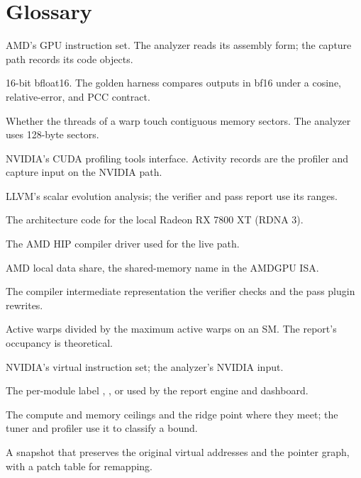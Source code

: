 \section{Glossary}
\label{app:glossary}

\begin{description}[leftmargin=0pt,style=nextline,itemsep=1pt]
  \item[AMDGPU] AMD's GPU instruction set. The analyzer reads its assembly
        form; the capture path records its code objects.
  \item[bf16] 16-bit bfloat16. The golden harness compares outputs in bf16
        under a cosine, relative-error, and PCC contract.
  \item[coalescing] Whether the threads of a warp touch contiguous memory
        sectors. The analyzer uses 128-byte sectors.
  \item[CUPTI] NVIDIA's CUDA profiling tools interface. Activity records are
        the profiler and capture input on the NVIDIA path.
  \item[DFA / SCEV] LLVM's scalar evolution analysis; the verifier and pass
        report use its ranges.
  \item[gfx1101] The architecture code for the local Radeon RX 7800 XT
        (RDNA 3).
  \item[hipcc] The AMD HIP compiler driver used for the live path.
  \item[LDS] AMD local data share, the shared-memory name in the AMDGPU ISA.
  \item[LLVM IR] The compiler intermediate representation the verifier checks
        and the pass plugin rewrites.
  \item[occupancy] Active warps divided by the maximum active warps on an SM.
        The report's occupancy is theoretical.
  \item[PTX] NVIDIA's virtual instruction set; the analyzer's NVIDIA input.
  \item[provenance.mode] The per-module label ,
        , or  used by the report engine and
        dashboard.
  \item[roofline] The compute and memory ceilings and the ridge point where
        they meet; the tuner and profiler use it to classify a bound.
  \item[VA-faithful] A snapshot that preserves the original virtual addresses
        and the pointer graph, with a patch table for remapping.
\end{description}






